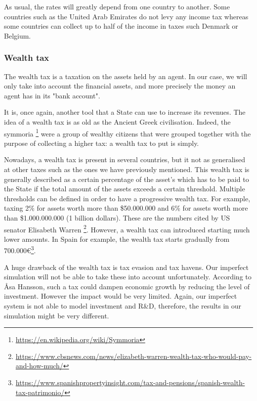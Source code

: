 \documentclass[20pt]{article}
\begin{document}
    As usual, the rates will greatly depend from one country to another. Some countries such as the United Arab Emirates do not levy any income tax whereas some countries can collect up to half of the income in taxes such Denmark or Belgium.
    
    \subsubsection{Wealth tax}\label{section:wealth_tax}
    
    The wealth tax is a taxation on the assets held by an agent. In our case, we will only take into account the financial assets, and more precisely the money an agent has in its "bank account".
    
    It is, once again, another tool that a State can use to increase its revenues. The idea of a wealth tax is as old as the Ancient Greek civilisation. Indeed, the symmoria \footnote{\url{https://en.wikipedia.org/wiki/Symmoria}} were a group of wealthy citizens that were grouped together with the purpose of collecting a higher tax: a wealth tax to put is simply.
    
    Nowadays, a wealth tax is present in several countries, but it not as generalised at other taxes such as the ones we have previously mentioned. This wealth tax is generally described as a certain percentage of the asset's which has to be paid to the State if the total amount of the assets exceeds a certain threshold. Multiple thresholds can be defined in order to have a progressive wealth tax. For example, taxing 2\% for assets worth more than \$50.000.000 and 6\% for assets worth more than \$1.000.000.000 (1 billion dollars). These are the numbers cited by US senator Elisabeth Warren \footnote{\url{https://www.cbsnews.com/news/elizabeth-warren-wealth-tax-who-would-pay-and-how-much/}}. However, a wealth tax can introduced starting much lower amounts. In Spain for example, the wealth tax starts gradually from 700.000\euro \footnote{\url{https://www.spanishpropertyinsight.com/tax-and-pensions/spanish-wealth-tax-patrimonio/}}.
    
    A huge drawback of the wealth tax is tax evasion and tax havens. Our imperfect simulation will not be able to take these into account unfortunately. According to Åsa Hansson, such a tax could dampen economic growth by reducing the level of investment. However the impact would be very limited.\cite{hansson2010wealth} Again, our imperfect system is not able to model investment and R\&D, therefore, the results in our simulation might be very different.
\end{document}
